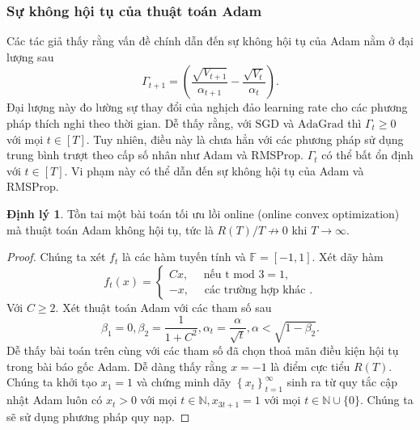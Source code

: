 \documentclass[11pt,oneside,a4paper]{report}
\theoremstyle{definition}
\newtheorem{dl}{Định lý}[section]
\begin{document}
\subsubsection{Sự không hội tụ của thuật toán Adam}
Các tác giả thấy rằng vấn đề chính dẫn đến sự không hội tụ của Adam nằm ở đại lượng sau
$$
\Gamma_{t+1}=\left(\dfrac{\sqrt{V_{t+1}}}{\alpha_{t+1}}-\dfrac{\sqrt{V_t}}{\alpha_t}\right).
$$
Đại lượng này đo lường sự thay đổi của nghịch đảo learning rate cho các phương pháp thích nghi theo thời gian. Dễ thấy rằng, với $\mathrm{SGD}$ và $\mathrm{AdaGrad}$ thì $\Gamma_t \geq 0$ với mọi $t \in[T]$. Tuy nhiên, điều này là chưa hẳn với các phương pháp sử dụng trung bình trượt theo cấp số nhân như Adam và RMSProp. $\Gamma_t$ có thể bất ổn định với $t \in[T]$. Vi phạm này có thể dẫn đến sự không hội tụ của Adam và RMSProp.
\begin{dl}
Tồn tai một bài toán tối ưu lồi online (online convex optimization) mà thuật toán Adam không hội tụ, tức là $R(T) / T \nrightarrow 0$ khi $T \rightarrow \infty$.
\begin{proof}
Chúng ta xét $f_t$ là các hàm tuyến tính và $\mathbb{F}=[-1,1]$. Xét dãy hàm
$$
f_t(x)=\left\{\begin{array}{l}
C x, \quad \text { nếu t mod } 3=1, \\
-x, \quad \text { các trường hợp khác }.
\end{array}\right.
$$
Với $C \geq 2$. Xét thuật toán Adam với các tham số sau
$$
\beta_1=0, \beta_2=\dfrac{1}{1+C^2}, \alpha_t=\dfrac{\alpha}{\sqrt{t}}, \alpha<\sqrt{1-\beta_2}.
$$
Dễ thấy bài toán trên cùng với các tham số đã chọn thoả mãn điều kiện hội tụ trong bài báo gốc Adam. Dễ dàng thấy rằng $x=-1$ là điểm cực tiểu $R(T)$.
Chúng ta khởi tạo $x_1=1$ và chứng minh dãy $\left\{x_t\right\}_{t=1}^{\infty}$ sinh ra từ quy tắc cập nhật Adam luôn có $x_t>0$ với mọi $t \in \mathbb{N}, x_{3 t+1}=1$ với mọi $t \in \mathbb{N} \cup\{0\}$. Chúng ta sẽ sử dụng phương pháp quy nạp.


\end{proof}
\end{dl}
\end{document}
